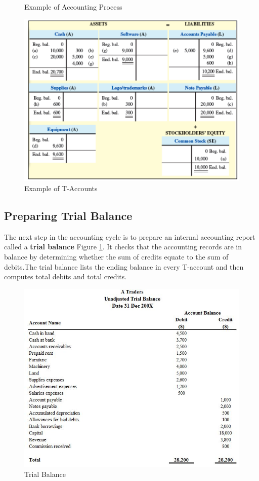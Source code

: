 \documentclass[../main.tex]{subfiles}
\begin{document}
\begin{figure}[ht!]
		\caption{Example of Accounting Process}
		\includegraphics[width=1\columnwidth]{images/c2/t_accounts_eg.png}
		\caption{Example of T-Accounts}
	\end{figure}

	\subsection{Preparing Trial Balance}
	
	The next step in the accounting cycle is to prepare an internal accounting 
	report called a \textbf{trial balance} \ie Figure \ref{fig:trial_balance}. 
	It checks that the accounting 
	records are in balance by determining whether the sum of credits equate to 
	the sum of debits.The trial balance lists the ending balance in every 
	T-account and then computes total debits and total credits.
	
	\begin{figure}[ht]
		\centering
		\includegraphics[width=1\columnwidth]{images/c2/How-to-Set-Up-a-Trial-Balance.jpg}
		\caption{Trial Balance}
		\label{fig:trial_balance}
	\end{figure}
	
\end{document}
